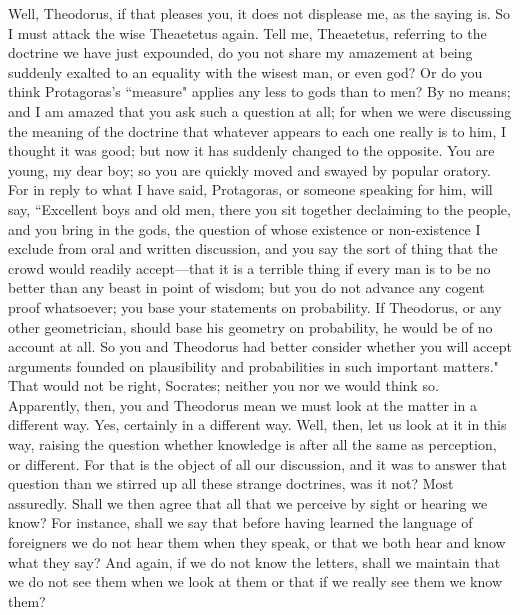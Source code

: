 \documentclass[letterpaper,12pt]{article}
\newcommand{\stephpag}[1]{\marginnote{\small\itshape\fontfamily{ppl}\selectfont #1}}
\begin{document}
\begin{drama}
\socratesspeaks
Well, Theodorus, if that pleases you, \stephpag{c} it does not displease me, as the saying is. So I must attack the wise Theaetetus again. Tell me, Theaetetus, referring to the doctrine we have just expounded, do you not share my amazement at being suddenly exalted to an equality with the wisest man, or even god? Or do you think Protagoras's ``measure" applies any less to gods than to men?
\theaetetusspeaks
By no means; and I am amazed that you ask such a question at all; for when we were discussing the meaning of the doctrine \stephpag{d} that whatever appears to each one really is to him, I thought it was good; but now it has suddenly changed to the opposite.
\socratesspeaks
You are young, my dear boy; so you are quickly moved and swayed by popular oratory. For in reply to what I have said, Protagoras, or someone speaking for him, will say, ``Excellent boys and old men, there you sit together declaiming to the people, and you bring in the gods, the question of whose \stephpag{e} existence or non-existence I exclude from oral and written discussion, and you say the sort of thing that the crowd would readily accept—that it is a terrible thing if every man is to be no better than any beast in point of wisdom; but you do not advance any cogent proof whatsoever; you base your statements on probability. If Theodorus, or any other geometrician, should base his geometry on probability, he would be of no account at all. So you and Theodorus had better consider whether you will accept arguments founded on plausibility and probabilities in \stephpag{163 a} such important matters."
\theaetetusspeaks
That would not be right, Socrates; neither you nor we would think so.
\socratesspeaks
Apparently, then, you and Theodorus mean we must look at the matter in a different way.
\theaetetusspeaks
Yes, certainly in a different way.
\socratesspeaks
Well, then, let us look at it in this way, raising the question whether knowledge is after all the same as perception, or different. For that is the object of all our discussion, and it was to answer that question than we stirred up all these strange doctrines, was it not?
\theaetetusspeaks
Most assuredly. \stephpag{b}
\socratesspeaks
Shall we then agree that all that we perceive by sight or hearing we know? For instance, shall we say that before having learned the language of foreigners we do not hear them when they speak, or that we both hear and know what they say? And again, if we do not know the letters, shall we maintain that we do not see them when we look at them or that if we really see them we know them?

\end{drama}
\end{document}
